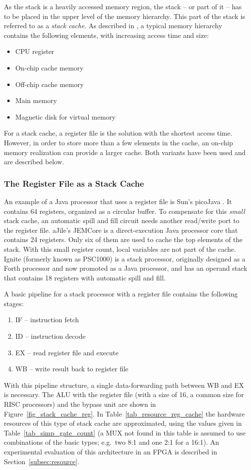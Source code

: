 As the stack is a heavily accessed memory region, the stack -- or
part of it -- has to be placed in the upper level of the memory
hierarchy. This part of the stack is referred to as a \emph{stack
cache}. As described in \cite{Hennessy02}, a typical memory hierarchy
contains the following elements, with increasing access time and
size:
%
\begin{itemize}
\item CPU register
\item On-chip cache memory
\item Off-chip cache memory
\item Main memory
\item Magnetic disk for virtual memory
\end{itemize}
%
For a stack cache, a register file is the solution with the shortest access
time. However, in order to store more than a few elements in the cache, an
on-chip memory realization can provide a larger cache. Both variants have
been used and are described below.

\subsubsection{The Register File as a Stack Cache}

An example of a Java processor that uses a register file is Sun's
picoJava \cite{pjMicroArch}. It contains 64 registers, organized as a
circular buffer. To compensate for this \emph{small} stack cache, an
automatic spill and fill circuit needs another read/write port to the
register file. aJile's JEMCore \cite{880720} is a direct-execution
Java processor core that contains 24 registers. Only six of them are
used to cache the top elements of the stack. With this small register
count, local variables are not part of the cache. Ignite
\cite{IGNITE} (formerly known as PSC1000) is a stack processor,
originally designed as a Forth processor and now promoted as a Java
processor, and has an operand stack that contains 18 registers with
automatic spill and fill.

A basic pipeline for a stack processor with a register file contains the
following stages:
%
\begin{enumerate}
\item IF -- instruction fetch
\item ID -- instruction decode
\item EX -- read register file and execute
\item WB -- write result back to register file
\end{enumerate}
%
With this pipeline structure, a single data-forwarding path between
WB and EX is necessary. The ALU with the register file (with a size
of 16, a common size for RISC processors) and the bypass unit are
shown in Figure~\ref{fig_stack_cache_reg}. In
Table~\ref{tab_resource_reg_cache} the hardware resources of this
type of stack cache are approximated, using the values given in
Table~\ref{tab_simp_gate_count} (a MUX not found in this table is
assumed to use combinations of the basic types; e.g.\ two 8:1 and
one 2:1 for a 16:1). An experimental evaluation of this architecture
in an FPGA is described in Section~\ref{subsec:resource}.

